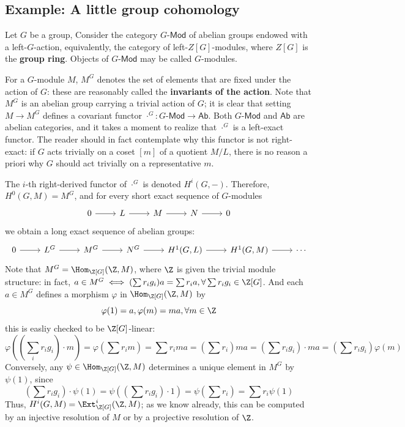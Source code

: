 \subsection{Example: A little group cohomology}
Let $G$ be a group, Consider the category $G$-$\mathsf{Mod}$ of abelian groups endowed with a left-$G$-action, equivalently, the category of left-$Z[G]$-modules, where $Z[G]$ is the \textbf{group ring}. Objects of $G$-$\mathsf{Mod}$ may be called $G$-modules.\par
For a $G$-module $M$, $M^G$ denotes the set of elements that are fixed under the action of $G$: these are reasonably called the \textbf{invariants of the action}. Note that $M^G$ is an abelian group carrying a trivial action of $G$; it is clear that setting $M\to M^G$ defines a covariant functor $\cdot^{G}:G$-$\mathsf{Mod}\to\mathsf{Ab}$. Both $G$-$\mathsf{Mod}$ and $\mathsf{Ab}$ are abelian categories, and it takes a moment to realize that $\cdot^G$ is a left-exact functor. The reader should in fact contemplate why this functor is not right-exact: if $G$ acts trivially on a coset $[m]$ of a quotient $M/L$, there is no reason a priori why $G$ should act trivially on a representative $m$.\par
The $i$-th right-derived functor of $\cdot^G$ is denoted $H^i(G,-)$. Therefore, $H^0(G,M)=M^G$, and for every short exact sequence of $G$-modules
\[\begin{tikzcd}
0\ar[r]&L\ar[r]&M\ar[r]&N\ar[r]&0
\end{tikzcd}\]
we obtain a long exact sequence of abelian groups:
\[\begin{tikzcd}
0\ar[r]&L^G\ar[r]&M^G\ar[r]&N^G\ar[r]&H^1(G,L)\ar[r]&H^1(G,M)\ar[r]&\cdots
\end{tikzcd}
\]
Note that $M^G=\Hom_{\Z[G]}(\Z,M)$, where $\Z$ is given the trivial module structure: in fact, $a\in M^G\iff (\sum r_ig_i)a=\sum r_ia,\forall \sum r_ig_i\in\Z[G]$. And each $a\in M^G$ defines a morphism $\varphi$ in $\Hom_{\Z[G]}(\Z,M)$ by
\[\varphi(1)=a,\varphi(m)=ma,\forall m\in\Z\]
this is easliy checked to be $\Z[G]$-linear: 
\[\varphi((\sum_ir_ig_i)\cdot m)=\varphi(\sum r_im)=\sum r_ima=(\sum r_i)ma=(\sum r_ig_i)\cdot ma=(\sum r_ig_i)\varphi(m)\]
Conversely, any $\psi\in\Hom_{\Z[G]}(\Z,M)$ determines a unique element in $M^G$ by $\psi(1)$, since
\[(\sum r_ig_i)\cdot\psi(1)=\psi((\sum r_ig_i)\cdot 1)=\psi(\sum r_i)=\sum r_i\psi(1)\]
Thus, $H^i(G,M)=\Ext^i_{\Z[G]}(\Z,M)$; as we know already, this can be computed by an injective resolution of $M$ or by a projective resolution of $\Z$.
